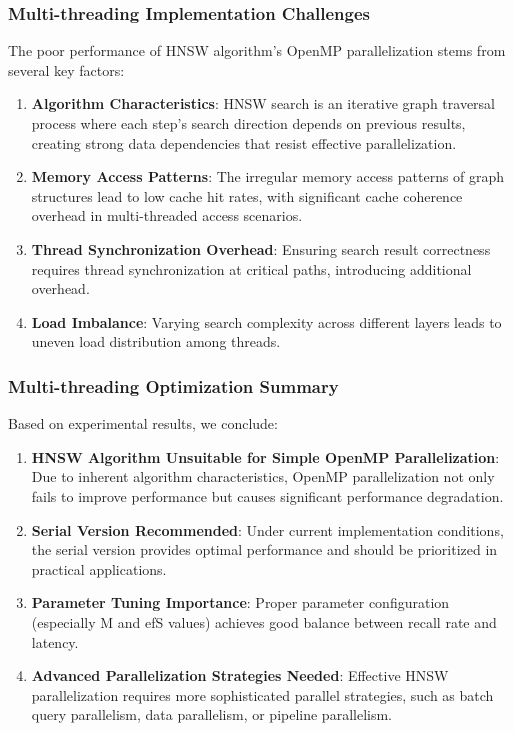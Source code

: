 \subsubsection{Multi-threading Implementation Challenges}

The poor performance of HNSW algorithm's OpenMP parallelization stems from several key factors:

\begin{enumerate}
    \item \textbf{Algorithm Characteristics}: HNSW search is an iterative graph traversal process where each step's search direction depends on previous results, creating strong data dependencies that resist effective parallelization.
    
    \item \textbf{Memory Access Patterns}: The irregular memory access patterns of graph structures lead to low cache hit rates, with significant cache coherence overhead in multi-threaded access scenarios.
    
    \item \textbf{Thread Synchronization Overhead}: Ensuring search result correctness requires thread synchronization at critical paths, introducing additional overhead.
    
    \item \textbf{Load Imbalance}: Varying search complexity across different layers leads to uneven load distribution among threads.
\end{enumerate}

\subsubsection{Multi-threading Optimization Summary}

Based on experimental results, we conclude:

\begin{enumerate}
    \item \textbf{HNSW Algorithm Unsuitable for Simple OpenMP Parallelization}: Due to inherent algorithm characteristics, OpenMP parallelization not only fails to improve performance but causes significant performance degradation.
    
    \item \textbf{Serial Version Recommended}: Under current implementation conditions, the serial version provides optimal performance and should be prioritized in practical applications.
    
    \item \textbf{Parameter Tuning Importance}: Proper parameter configuration (especially M and efS values) achieves good balance between recall rate and latency.
    
    \item \textbf{Advanced Parallelization Strategies Needed}: Effective HNSW parallelization requires more sophisticated parallel strategies, such as batch query parallelism, data parallelism, or pipeline parallelism.
\end{enumerate} 